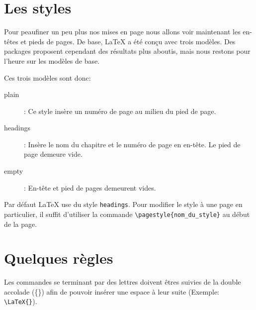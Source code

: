 \section{Les styles}
Pour peaufiner un peu plus nos mises en page nous allons voir maintenant les en-têtes et pieds de pages. De base, \LaTeX{} a été conçu avec trois modèles. Des packages proposent cependant des résultats plus aboutis, mais nous restons pour l'heure sur les modèles de base.
\medskip

Ces trois modèles sont donc:
\begin{description}
    \item[plain]: Ce style insère un numéro de page au milieu du pied de page.
    \item[headings]: Insère le nom du chapitre et le numéro de page en en-tête. Le pied de page demeure vide.
    \item[empty]: En-tête et pied de pages demeurent vides.
\end{description}
\medskip

Par défaut \LaTeX{} use du style \texttt{headings}. Pour modifier le style à une page en particulier, il suffit d'utiliser la commande \verb|\pagestyle{nom_du_style}| au début de la page.
\medskip

\section{Quelques règles}
Les commandes se terminant par des lettres doivent êtres suivies de la double accolade (\{\}) afin de pouvoir insérer une espace à leur suite (Exemple: \verb|\LaTeX{}|).
\medskip
